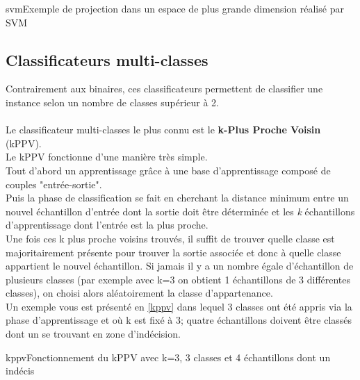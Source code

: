 \documentclass[overfullbox, poster]{polytech/polytech}
\begin{document}
\begin{Figure}{svm}{Exemple de projection dans un espace de plus grande dimension réalisé par SVM}
\end{Figure}


\subsection{Classificateurs multi-classes}
Contrairement aux binaires, ces classificateurs permettent de classifier une instance selon un nombre de classes supérieur à 2.\\
\\
Le classificateur multi-classes le plus connu est le \textbf{k-Plus Proche Voisin} (kPPV).\\
Le kPPV fonctionne d'une manière très simple.\\
Tout d'abord un apprentissage grâce à une base d'apprentissage composé de couples "entrée-sortie".\\
Puis la phase de classification se fait en cherchant la distance minimum entre un nouvel échantillon d'entrée dont la sortie doit être déterminée et les \textit{k} échantillons d'apprentissage dont l'entrée est la plus proche.\\
Une fois ces k plus proche voisins trouvés, il suffit de trouver quelle classe est majoritairement présente pour trouver la sortie associée et donc à quelle classe appartient le nouvel échantillon. Si jamais il y a un nombre égale d'échantillon de plusieurs classes (par exemple avec k=3 on obtient 1 échantillons de 3 différentes classes), on choisi alors aléatoirement la classe d'appartenance.\\
Un exemple vous est présenté en \autoref{kppv} dans lequel 3 classes ont été appris via la phase d'apprentissage et où k est fixé à 3; quatre échantillons doivent être classés dont un se trouvant en zone d'indécision.

\begin{Figure}{kppv}{Fonctionnement du kPPV avec k=3, 3 classes et 4 échantillons dont un indécis}
\end{Figure}
\end{document}
